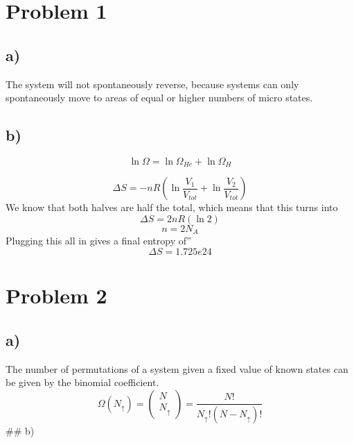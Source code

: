 \documentclass[]{article}
\begin{document}

\hypertarget{problem-1}{%
\section{Problem 1}\label{problem-1}}

\hypertarget{a}{%
\subsection{a)}\label{a}}

The system will not spontaneously reverse, because systems can only
spontaneously move to areas of equal or higher numbers of micro states.

\hypertarget{b}{%
\subsection{b)}\label{b}}

\[
\ln\Omega= \ln\Omega_{He}+\ln\Omega_{H}
\]

\[
\Delta S = -nR\left( \ln \frac{V_{1}}{V_{tot}}+\ln \frac{V_{2}}{V_{tot}} \right) 
\] We know that both halves are half the total, which means that this
turns into \[
\Delta S=2nR\left( \ln{2} \right) 
\] \[
n = 2N_{A}
\] Plugging this all in gives a final entropy of'' \[
\Delta S = 1.725e24
\]

\hypertarget{problem-2}{%
\section{Problem 2}\label{problem-2}}

\hypertarget{a-1}{%
\subsection{a)}\label{a-1}}

The number of permutations of a system given a fixed value of known
states can be given by the binomial coefficient. \[
\Omega(N_{\uparrow})=\begin{pmatrix}
N \\
N_{\uparrow}
\end{pmatrix} = \frac{{N!}}{N_{\uparrow}!\left( N-N_{\uparrow} \right) !}
\] \#\# b)
\end{document}
